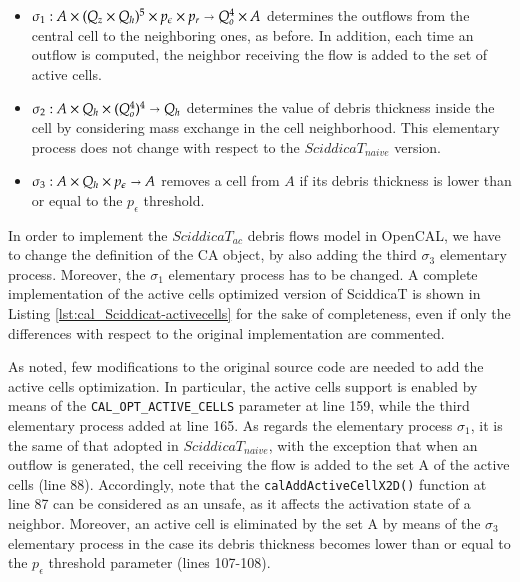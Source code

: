\begin{itemize}
\item $\sigma_1 : A \times (Q_z \times Q_h)^5 \times p_\epsilon \times p_r
  \shortrightarrow Q_o^4 \times A$ determines the outflows from the
  central cell to the neighboring ones, as before. In addition, each
  time an outflow is computed, the neighbor receiving the flow is
  added to the set of active cells.

\item $\sigma_2: A \times Q_h \times (Q_o^4)^4 \shortrightarrow Q_h$ determines
  the value of debris thickness inside the cell by considering mass
  exchange in the cell neighborhood. This elementary process does not
  change with respect to the $SciddicaT_{naive}$ version.

\item $\sigma_3: A \times Q_h \times p_\epsilon \shortrightarrow A$
  removes a cell from $A$ if its debris thickness is lower than or
  equal to the $p_\epsilon$ threshold.
\end{itemize}

In order to implement the $SciddicaT_{ac}$ debris flows model in
OpenCAL, we have to change the definition of the CA object, by also
adding the third $\sigma_3$ elementary process. Moreover, the
$\sigma_1$ elementary process has to be changed. A complete
implementation of the active cells optimized version of SciddicaT is
shown in Listing \ref{lst:cal_Sciddicat-activecells} for the sake of
completeness, even if only the differences with respect to the
original implementation are commented.





As noted, few modifications to the original source code are needed to
add the active cells optimization. In particular, the active cells
support is enabled by means of the \verb'CAL_OPT_ACTIVE_CELLS'
parameter at line 159, while the third elementary process added at
line 165. As regards the elementary process $\sigma_1$, it is the same
of that adopted in $SciddicaT_{naive}$, with the exception that when
an outflow is generated, the cell receiving the flow is added to the
set A of the active cells (line 88). Accordingly, note that the
\verb'calAddActiveCellX2D()' function at line 87 can be considered as
an unsafe, as it affects the activation state of a neighbor. Moreover,
an active cell is eliminated by the set A by means of the $\sigma_3$
elementary process in the case its debris thickness becomes lower than
or equal to the $p_\epsilon$ threshold parameter (lines 107-108).

